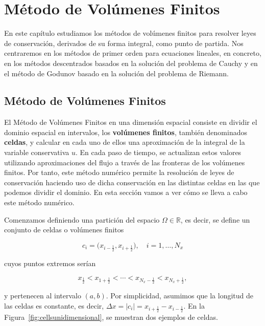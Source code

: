 \chapter{Método de Volúmenes Finitos}\label{ch:finitevolume}

En este capítulo estudiamos los métodos de volúmenes finitos para
resolver leyes de conservación, derivados de su forma integral, como
punto de partida.
Nos centraremos en los métodos de primer orden para ecuaciones
lineales, en concreto, en los métodos descentrados basados en la
solución del problema de Cauchy y en el método de Godunov basado en
la solución del problema de Riemann.

\section{Método de Volúmenes Finitos}

El Método de Volúmenes Finitos en una dimensión espacial consiste en
dividir el dominio espacial en intervalos, los
\textbf{volúmenes finitos}, también denominados \textbf{celdas}, y
calcular en cada uno de ellos una aproximación de la integral de la
variable conservativa $u$.
En cada paso de tiempo, se actualizan estos valores utilizando
aproximaciones del flujo a través de las fronteras de los volúmenes
finitos.
Por tanto, este método numérico permite la resolución de leyes de
conservación haciendo uso de dicha conservación en las distintas
celdas en las que podemos dividir el dominio.
En esta sección vamos a ver cómo se lleva a cabo este método
numérico.

Comenzamos definiendo una partición del espacio
$\Omega\in\mathbb{R}$, es decir, se define un conjunto de celdas o
volúmenes finitos

\begin{equation*}
  c_{i}=
  \big(
  x_{i-\frac{1}{2}},
  x_{i+\frac{1}{2}}
  \big),\quad
  i=1,\dotsc,N_{x}
\end{equation*}

cuyos puntos extremos serían

\begin{equation*}
  x_{\frac{1}{2}}<
  x_{1+\frac{1}{2}}<
  \cdots<
  x_{N_{x}-\frac{1}{2}}<
  x_{N_{x}+\frac{1}{2}},
\end{equation*}

y pertenecen al intervalo $\left(a,b\right)$.
Por simplicidad, asumimos que la longitud de las celdas es constante,
es decir,
\begin{math}
  \Delta x=
  \left|c_{i}\right|=
  x_{i+\frac{1}{2}}-
  x_{i-\frac{1}{2}}
\end{math}.
En la Figura~\ref{fig:cellsunidimensional}, se muestran dos ejemplos
de celdas.

